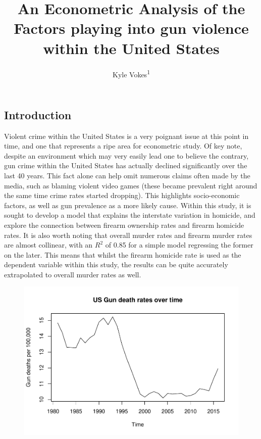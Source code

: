 \documentclass[floatsintext,mask,man]{apa6}
\title{An Econometric Analysis of the Factors playing into gun violence within
the United States}
\author{Kyle Vokes\textsuperscript{1}}
\affiliation{
    \vspace{0.5cm}
          \textsuperscript{1} Macewan University  }
\theoremstyle{definition}
\theoremstyle{definition}
\theoremstyle{definition}
\theoremstyle{remark}
\begin{document}
\maketitle

\setcounter{secnumdepth}{0}



\subsection{Introduction}\label{introduction}

Violent crime within the United States is a very poignant issue at this
point in time, and one that represents a ripe area for econometric
study. Of key note, despite an environment which may very easily lead
one to believe the contrary, gun crime within the United States has
actually declined significantly over the last 40 years. This fact alone
can help omit numerous claims often made by the media, such as blaming
violent video games (these became prevalent right around the same time
crime rates started dropping). This highlights socio-economic factors,
as well as gun prevalence as a more likely cause. Within this study, it
is sought to develop a model that explains the interstate variation in
homicide, and explore the connection between firearm ownership rates and
firearm homicide rates. It is also worth noting that overall murder
rates and firearm murder rates are almost collinear, with an \(R^2\) of
0.85 for a simple model regressing the former on the later. This means
that whilst the firearm homicide rate is used as the dependent variable
within this study, the results can be quite accurately extrapolated to
overall murder rates as well.

\begin{figure}
\centering
\includegraphics{as_files/figure-latex/unnamed-chunk-2-1.pdf}
\caption{}
\end{figure}
\end{document}
